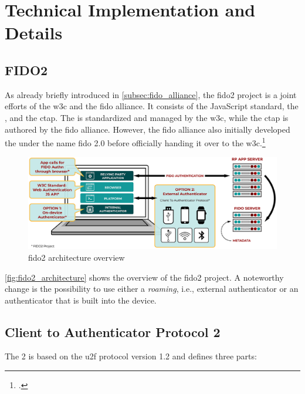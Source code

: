 \section{Technical Implementation and Details}

\subsection{FIDO2}

As already briefly introduced in \autoref{subsec:fido_alliance}, the \gls{fido}2 project is a joint efforts of the \gls{w3c} and the \gls{fido} alliance. It consists of the JavaScript standard, the \wa{}, and the \gls{ctap}. The \wa{} is standardized and managed by the \gls{w3c}, while the \gls{ctap} is authored by the \gls{fido} alliance. However, the \gls{fido} alliance also initially developed the \wa{} under the name \gls{fido} 2.0 before officially handing it over to the \gls{w3c}.\footcites[See][254]{Schwartz2018}[See][3]{FormalVerificationWebAuthn}

\begin{figure}[hbt]
	\centering
	\includegraphics[width=\textwidth]{pics/FIDO2-Graphic-v2.eps}
	\caption[\gls{fido}2 architecture overview]{\gls{fido}2 architecture overview\footnotemark}
	\label{fig:fido2_architecture}
\end{figure}

\autoref{fig:fido2_architecture} shows the overview of the \gls{fido}2 project. A noteworthy change is the possibility to use either a \textit{roaming}, i.e., external authenticator or an authenticator that is built into the device.

\subsection{Client to Authenticator Protocol 2}

The  2 is based on the \gls{u2f} protocol version 1.2 and defines three parts:

